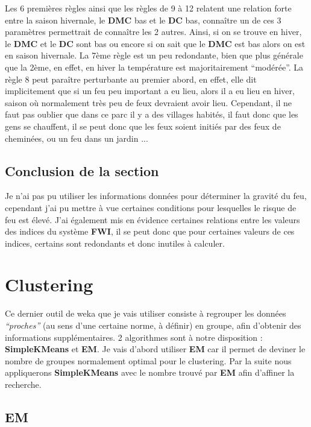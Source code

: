 \documentclass{article}
\begin{document}
\begin{sffamily}
Les 6 premières règles ainsi que les règles de 9 à 12 relatent une relation forte entre la saison hivernale, le \textbf{DMC} bas et le \textbf{DC} 
bas, connaître un de ces 3 paramètres permettrait de connaître les 2 autres. Ainsi, si on se trouve en hiver, le \textbf{DMC} et le \textbf{DC} sont 
bas ou encore si on sait que le \textbf{DMC} est bas alors on est en saison hivernale. La 7ème règle est un peu redondante, bien que plus générale 
que la 2ème, en effet, en hiver la température est majoritairement ``modérée''. La règle 8 peut paraître perturbante au premier abord, en effet, elle 
dit implicitement que si un feu peu important a eu lieu, alors il a eu lieu en hiver, saison où normalement très peu de feux devraient avoir lieu. 
Cependant, il ne faut pas oublier que dans ce parc il y a des villages habités, il faut donc que les gens se chauffent, il se peut donc que les feux 
soient initiés par des feux de cheminées, ou un feu dans un jardin ...

\subsection{Conclusion de la section}

Je n'ai pas pu utiliser les informations données pour déterminer la gravité du feu, cependant j'ai pu mettre à vue certaines conditions pour 
lesquelles le risque de feu est élevé. J'ai également mis en évidence certaines relations entre les valeurs des indices du système \textbf{FWI}, il 
se peut donc que pour certaines valeurs de ces indices, certains sont redondants et donc inutiles à calculer.

\newpage

\section{Clustering}

Ce dernier outil de weka que je vais utiliser consiste à regrouper les données \textit{``proches''} (au sens d'une certaine norme, à définir) en 
groupe, afin d'obtenir des informations supplémentaires. 2 algorithmes sont à notre disposition : \textbf{SimpleKMeans} et \textbf{EM}. Je vais 
d'abord utiliser \textbf{EM} car il permet de deviner le nombre de groupes normalement optimal pour le clustering. Par la suite nous appliquerons 
\textbf{SimpleKMeans} avec le nombre trouvé par \textbf{EM} afin d'affiner la recherche.

\subsection{EM}


\end{sffamily}
\end{document}
